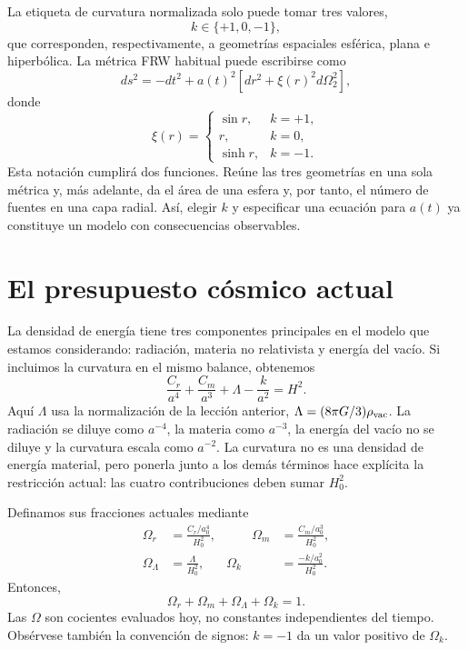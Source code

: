 La etiqueta de curvatura normalizada solo puede tomar tres valores,
\begin{equation}
k\in\{+1,0,-1\},
\end{equation}
que corresponden, respectivamente, a geometrías espaciales esférica, plana e hiperbólica. La métrica FRW habitual puede escribirse como
\begin{equation}
ds^2=-dt^2+a(t)^2\left[dr^2+\xi(r)^2d\Omega_2^2\right],
\label{eq:c06-frw}
\end{equation}
donde
\begin{equation}
\xi(r)=
\begin{cases}
\sin r, & k=+1,\\
r, & k=0,\\
\sinh r, & k=-1.
\end{cases}
\label{eq:c06-xi}
\end{equation}
Esta notación cumplirá dos funciones. Reúne las tres geometrías en una sola métrica y, más adelante, da el área de una esfera y, por tanto, el número de fuentes en una capa radial. Así, elegir \(k\) y especificar una ecuación para \(a(t)\) ya constituye un modelo con consecuencias observables.

\section{El presupuesto cósmico actual}

La densidad de energía tiene tres componentes principales en el modelo que estamos considerando: radiación, materia no relativista y energía del vacío. Si incluimos la curvatura en el mismo balance, obtenemos
\begin{equation}
\frac{C_r}{a^4}
+\frac{C_m}{a^3}
+\Lambda
-\frac{k}{a^2}
=H^2.
\label{eq:c06-budget}
\end{equation}
Aquí \(\Lambda\) usa la normalización de la lección anterior, \(\Lambda=(8\pi G/3)\rho_{\rm vac}\). La radiación se diluye como \(a^{-4}\), la materia como \(a^{-3}\), la energía del vacío no se diluye y la curvatura escala como \(a^{-2}\). La curvatura no es una densidad de energía material, pero ponerla junto a los demás términos hace explícita la restricción actual: las cuatro contribuciones deben sumar \(H_0^2\).

Definamos sus fracciones actuales mediante
\begin{equation}
\begin{aligned}
\Omega_r&=\frac{C_r/a_0^4}{H_0^2},
&\qquad
\Omega_m&=\frac{C_m/a_0^3}{H_0^2},\\
\Omega_\Lambda&=\frac{\Lambda}{H_0^2},
&
\Omega_k&=\frac{-k/a_0^2}{H_0^2}.
\end{aligned}
\label{eq:c06-omegas}
\end{equation}
Entonces,
\begin{equation}
\boxed{\Omega_r+\Omega_m+\Omega_\Lambda+\Omega_k=1.}
\label{eq:c06-sum-rule}
\end{equation}
Las \(\Omega\) son cocientes evaluados hoy, no constantes independientes del tiempo. Obsérvese también la convención de signos: \(k=-1\) da un valor positivo de \(\Omega_k\).

